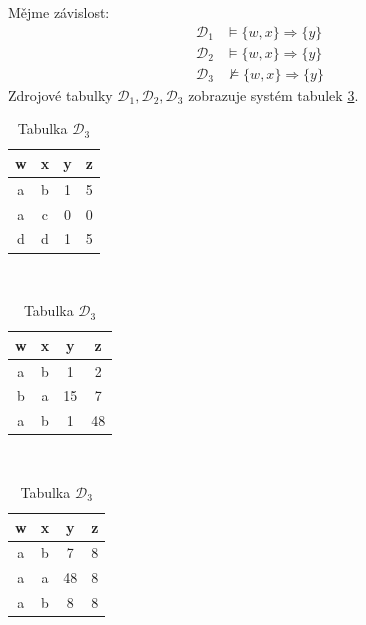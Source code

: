 \begin{upexample}\label{prik:funk}
Mějme závislost:
\begin{align*}
\mathcal{D}_{1} &\vDash \{ w, x \} \Rightarrow \{ y \} \\
\mathcal{D}_{2} &\vDash \{ w, x \} \Rightarrow \{ y \} \\
\mathcal{D}_{3} &\nvDash \{ w, x \} \Rightarrow \{ y \}
\end{align*}
Zdrojové tabulky $\mathcal{D}_{1}, \mathcal{D}_{2}, \mathcal{D}_{3}$ zobrazuje systém tabulek \ref{tab:funk}.

\begin{table}
\caption{Tabulky k příkladu \ref{prik:funk}}\label{tab:funk}
\begin{subtable}[t]{0.3\textwidth}
\centering
\caption{Tabulka $\mathcal{D}_{1}$}
\begin{tabular}{c c c c}
w & x & y & z \\
\hline
a & b & 1 & 5 \\
a & c & 0 & 0 \\
d & d & 1 & 5
\end{tabular}
\end{subtable}
~
\begin{subtable}[t]{0.3\textwidth}
\centering
\caption{Tabulka $\mathcal{D}_{2}$}
\begin{tabular}{c c c c}
w & x & y & z \\
\hline
\cellcolor{green}a & \cellcolor{green}b & \cellcolor{green}1 & 2 \\
b & a & 15 & 7 \\
\cellcolor{green}a & \cellcolor{green}b & \cellcolor{green}1 & 48
\end{tabular}
\end{subtable}
~
\begin{subtable}[t]{0.3\textwidth}
\centering
\caption{Tabulka $\mathcal{D}_{3}$}
\begin{tabular}{c c c c}
w & x & y & z \\
\hline
\cellcolor{green}a & \cellcolor{green}b & \cellcolor{red}7 & 8 \\
a & a & 48 & 8 \\
\cellcolor{green}a & \cellcolor{green}b & \cellcolor{red}8 & 8
\end{tabular}
\end{subtable}
\end{table}
\end{upexample}

